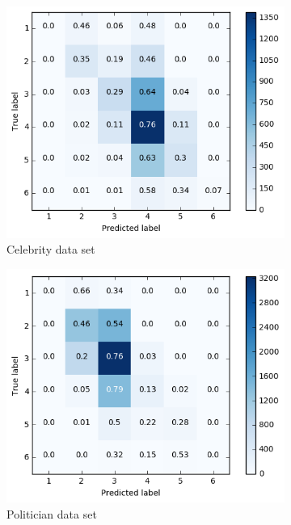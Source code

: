 \begin{figure}[h]
\begin{subfigure}{.5\textwidth}
  \includegraphics[width=.95\linewidth]{img/celeb_lin_cm_retweets}
  \caption{Celebrity data set}
  \label{fig:retw_distr_sub1}
\end{subfigure}%
\begin{subfigure}{.5\textwidth}
  \includegraphics[width=.95\linewidth]{img/polit_lin_cm_retweets}
  \caption{Politician data set}
  \label{fig:retw_distr_sub2}
\end{subfigure}
\begin{subfigure}{.5\textwidth}

\end{subfigure}
\end{figure}
